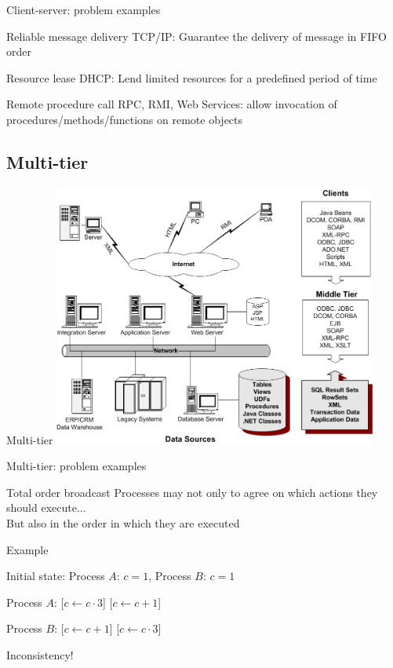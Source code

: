 \begin{frame}{Client-server: problem examples}
\begin{block}{Reliable message delivery}
TCP/IP: Guarantee the delivery of message in FIFO order
\end{block}

\begin{block}{Resource lease}
DHCP: Lend limited resources for a predefined period of time
\end{block}

\begin{block}{Remote procedure call}
RPC, RMI, Web Services: allow invocation of procedures/methods/functions
on remote objects
\end{block}

\end{frame}

\subsection{Multi-tier}

\begin{frame}{Multi-tier}
\includegraphics[width=0.8\textwidth]{figs/01/multi-tier.png}	
\end{frame}

\begin{frame}{Multi-tier: problem examples}
	
\begin{block}{Total order broadcast}
Processes may not only to agree on which actions they should execute...\\
But also in the order in which they are executed
\end{block}

\bigskip
Example
\BI
\item Initial state: Process $A$: $c=1$, Process $B$: $c=1$
\item Process $A$: [$c \gets c \cdot 3$] [$c \gets c+1$]
\item Process $B$: [$c \gets c+1$] [$c \gets c \cdot 3$]
\item Inconsistency! 
\EI
\end{frame}

